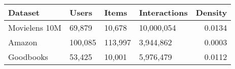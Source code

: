\begin{tabularx}{\columnwidth}{llllr}
\toprule
 Dataset       & Users   & Items   & Interactions   &   Density \\
\midrule
 Movielens 10M & 69,879  & 10,678  & 10,000,054     &    0.0134 \\
 Amazon        & 100,085 & 113,997 & 3,944,862      &    0.0003 \\
 Goodbooks     & 53,425  & 10,001  & 5,976,479      &    0.0112 \\
\bottomrule
\end{tabularx}